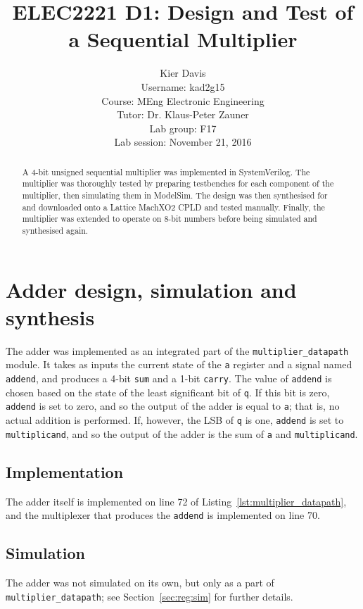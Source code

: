 \documentclass[a4paper]{article}
\title{ELEC2221 D1: Design and Test of a Sequential Multiplier}
\author{Kier Davis \\
Username: kad2g15 \\
Course: MEng Electronic Engineering \\
Tutor: Dr. Klaus-Peter Zauner \\
Lab group: F17 \\
Lab session: November 21, 2016}
\begin{document}
\maketitle

\begin{abstract}
  A 4-bit unsigned sequential multiplier was implemented in SystemVerilog. The multiplier was thoroughly tested by preparing testbenches for each component of the multiplier, then simulating them in ModelSim. The design was then synthesised for and downloaded onto a Lattice MachXO2 CPLD and tested manually. Finally, the multiplier was extended to operate on 8-bit numbers before being simulated and synthesised again.
\end{abstract}

\section{Adder design, simulation and synthesis}
\label{sec:adder}

The adder was implemented as an integrated part of the \texttt{multiplier\_datapath} module. It takes as inputs the current state of the \texttt{a} register and a signal named \texttt{addend}, and produces a 4-bit \texttt{sum} and a 1-bit \texttt{carry}. The value of \texttt{addend} is chosen based on the state of the least significant bit of \texttt{q}. If this bit is zero, \texttt{addend} is set to zero, and so the output of the adder is equal to \texttt{a}; that is, no actual addition is performed. If, however, the LSB of \texttt{q} is one, \texttt{addend} is set to \texttt{multiplicand}, and so the output of the adder is the sum of \texttt{a} and \texttt{multiplicand}.

\subsection{Implementation}
\label{sec:adder:impl}

The adder itself is implemented on line 72 of Listing~\ref{lst:multiplier_datapath}, and the multiplexer that produces the \texttt{addend} is implemented on line 70.

\subsection{Simulation}
\label{sec:adder:sim}

The adder was not simulated on its own, but only as a part of \texttt{multiplier\_datapath}; see Section~\ref{sec:reg:sim} for further details.
\end{document}
